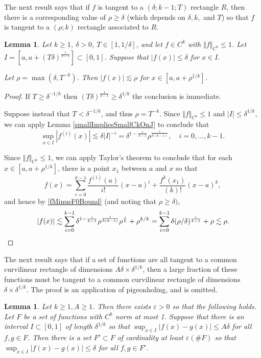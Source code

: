 \documentclass[letterpaper, reqno,11pt]{article}
\numberwithin{equation}{section}
\newcommand{\eps}{\varepsilon}
\numberwithin{thm}{section}
\newtheorem{lem}[thm]{Lemma}
\theoremstyle{remark}
\begin{document}
%
%
The next result says that if $f$ is tangent to a $(\delta; k-1; T)$ rectangle $R$, then there is a corresponding value of $\rho\geq\delta$ (which depends on $\delta, k,$ and $T$) so that $f$ is tangent to a $(\rho;k)$ rectangle associated to $R$. 

\begin{lem}\label{longRectInsideKP1Rect}
Let $k\geq 1$, $\delta>0$, $T\in[1,1/\delta]$, and let $f\in C^{k}$ with $\Vert f \Vert_{C^k}\leq 1$. Let $I = [a,a+(T\delta)^{\frac{1}{k-1}}] \subset[0,1]$. Suppose that $|f(x)|\leq\delta$ for $x\in I$. 

Let $\rho = \max(\delta, T^{-k})$. Then $|f(x)|\lesssim\rho$ for $x\in [a, a+\rho^{1/k}]$. 
\end{lem}
%
\begin{proof}
If $T\geq\delta^{-1/k}$ then $(T\delta)^{\frac{1}{k-1}}\geq\delta^{1/k}$ the conclusion is immediate. 

Suppose instead that $T<\delta^{-1/k}$, and thus $\rho=T^{-k}$. Since $\Vert f \Vert_{C^k}\leq 1$ and $|I|\leq\delta^{1/k}$, we can apply Lemma \ref{smallImpliesSmallCkOnJ} to conclude that
\begin{equation}\label{fMinusF0Bound}
\sup_{x\in I}|f^{(i)}(x)|\lesssim\delta|I|^{-i} = \delta^{1-\frac{i}{k-1}}\rho^{\frac{i}{k(k-1)}},\quad i=0,\ldots,k-1.
\end{equation}

Since $\Vert f \Vert_{C^k}\leq 1$, we can apply Taylor's theorem to conclude that for each $x\in [a, a+\rho^{1/k}]$, there is a point $x_1$ between $a$ and $x$ so that
\[
f(x) = \sum_{i=0}^{k-1} \frac{f^{(i)}(a)}{i!}(x-a)^i + \frac{f^{k}(x_1)}{(k)!}(x-a)^{k},
\]
and hence by \eqref{fMinusF0Bound} (and noting that $\rho\geq\delta)$,
\begin{equation*}
\begin{split}
|f(x)|
\lesssim  \sum_{i=0}^{k-1}   \delta^{1-\frac{i}{k-1}}\rho^{\frac{i}{k(k-1)}} \rho^{\frac{i}{k}} + \rho^{k/k}
= \sum_{i=0}^{k-1}   \delta(\rho/\delta)^{\frac{i}{k-1}} + \rho
\lesssim \rho.\qedhere
\end{split}
\end{equation*}
\end{proof}

The next result says that if a set of functions are all tangent to a common curvilinear rectangle of dimensions $A\delta\times \delta^{1/k}$, then a large fraction of these functions must be tangent to a common curvilinear rectangle of dimensions $\delta\times\delta^{1/k}$. The proof is an application of pigeonholing, and is omitted. 
\begin{lem}\label{thickenedVsRegularRectangleLem}
Let $k\geq 1, A\geq 1$. Then there exists $\eps>0$ so that the following holds. Let $F$ be a set of functions with $C^k$ norm at most 1. Suppose that there is an interval $I\subset[0,1]$ of length $\delta^{1/k}$ so that $\sup_{x\in I}|f(x)-g(x)|\leq A \delta$ for all $f,g\in F$. Then there is a set $F'\subset F$ of cardinality at least $\eps(\#F)$ so that $\sup_{x\in I}|f(x)-g(x)|\leq  \delta$ for all $f,g\in F'$. 
\end{lem}
\end{document}
